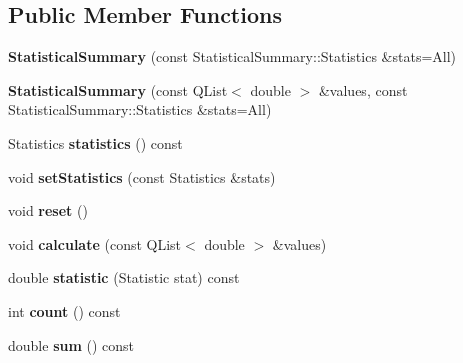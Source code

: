 \subsection*{Public Member Functions}
\begin{DoxyCompactItemize}
\item 
\mbox{\label{class_statistical_summary_a14e3f33275031fad39d9a258815f7759}} 
{\bfseries Statistical\+Summary} (const Statistical\+Summary\+::\+Statistics \&stats=All)
\item 
\mbox{\label{class_statistical_summary_ae5ab60497b614665fbf1b0b57993b230}} 
{\bfseries Statistical\+Summary} (const Q\+List$<$ double $>$ \&values, const Statistical\+Summary\+::\+Statistics \&stats=All)
\item 
\mbox{\label{class_statistical_summary_a385bc8ddcdb300e3b5f0c0e5cc4fd5e9}} 
Statistics {\bfseries statistics} () const
\item 
\mbox{\label{class_statistical_summary_af7936b507d0d296e1597503f8b27731d}} 
void {\bfseries set\+Statistics} (const Statistics \&stats)
\item 
\mbox{\label{class_statistical_summary_a2a4457007a12a12f7318dc5b35928c77}} 
void {\bfseries reset} ()
\item 
\mbox{\label{class_statistical_summary_a0ac5fd745175537658e413a0c5420300}} 
void {\bfseries calculate} (const Q\+List$<$ double $>$ \&values)
\item 
\mbox{\label{class_statistical_summary_ab8efeae31c1f8746717a9e04052b9061}} 
double {\bfseries statistic} (Statistic stat) const
\item 
\mbox{\label{class_statistical_summary_a4c9db57d63440381803c0c3217d0f83c}} 
int {\bfseries count} () const
\item 
\mbox{\label{class_statistical_summary_a5577efb25ec3e33290481df860da54c1}} 
double {\bfseries sum} () const
\item 

\end{DoxyCompactItemize}
